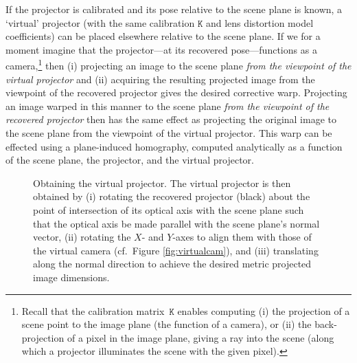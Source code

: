 \documentclass[review]{elsarticle}
\begin{document}
If the projector is calibrated and its pose relative to the scene plane is known, a `virtual' projector (with the same calibration $\mathtt{K}$ and lens distortion model coefficients) can be placed elsewhere relative to the scene plane. If we for a moment imagine that the projector---at its recovered pose---functions as a camera,\footnote{Recall that the calibration matrix~$\mathtt{K}$ enables computing (i) the projection of a scene point to the image plane (the function of a camera), or (ii) the back-projection of a pixel in the image plane, giving a ray into the scene (along which a projector illuminates the scene with the given pixel).} then (i) projecting an image to the scene plane \textit{from the viewpoint of the virtual projector} and (ii) acquiring the resulting projected image from the viewpoint of the recovered projector gives the desired corrective warp. Projecting an image warped in this manner to the scene plane \textit{from the viewpoint of the recovered projector} then has the same effect as projecting the original image to the scene plane from the viewpoint of the virtual projector. This warp can be effected using a plane-induced homography, computed analytically as a function of the scene plane, the projector, and the virtual projector.

\begin{figure}
    \centering
    \qquad
    \caption{Obtaining the virtual projector. The virtual projector is then obtained by (i) rotating the recovered projector (black) about the point of intersection of its optical axis with the scene plane such that the optical axis be made parallel with the scene plane's normal vector, (ii) rotating the $X$- and $Y$-axes to align them with those of the virtual camera (cf.\ Figure \ref{fig:virtualcam}), and (iii) translating along the normal direction to achieve the desired metric projected image dimensions.} %
    \label{fig:virtualproj}
\end{figure}
\end{document}
